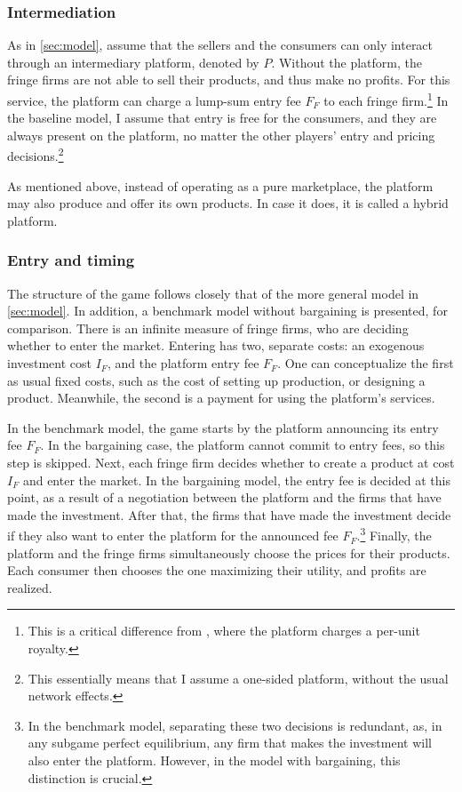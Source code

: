 \documentclass[a4paper]{article}
\begin{document}
\subsubsection{Intermediation}

As in \cref{sec:model}, assume that the sellers and the consumers can only interact through an intermediary platform, denoted by $P$.
Without the platform, the fringe firms are not able to sell their products, and thus make no profits.
For this service, the platform can charge a lump-sum entry fee $F_F$ to each fringe firm.\footnote{
    This is a critical difference from \textcite[]{anderson2021hybrid}, where the platform charges a per-unit royalty.
}
In the baseline model, I assume that entry is free for the consumers, and they are always present on the platform, no matter the other players' entry and pricing decisions.\footnote{
    This essentially means that I assume a one-sided platform, without the usual network effects.
}

As mentioned above, instead of operating as a pure marketplace, the platform may also produce and offer its own products.
In case it does, it is called a hybrid platform.

\subsubsection{Entry and timing}

The structure of the game follows closely that of the more general model in \cref{sec:model}.
In addition, a benchmark model without bargaining is presented, for comparison.
There is an infinite measure of fringe firms, who are deciding whether to enter the market.
Entering has two, separate costs: an exogenous investment cost $I_F$, and the platform entry fee $F_F$.
One can conceptualize the first as usual fixed costs, such as the cost of setting up production, or designing a product.
Meanwhile, the second is a payment for using the platform's services.

In the benchmark model, the game starts by the platform announcing its entry fee $F_F$.
In the bargaining case, the platform cannot commit to entry fees, so this step is skipped.
Next, each fringe firm decides whether to create a product at cost $I_F$ and enter the market.
In the bargaining model, the entry fee is decided at this point, as a result of a negotiation between the platform and the firms that have made the investment.
After that, the firms that have made the investment decide if they also want to enter the platform for the announced fee $F_F$.\footnote{
    In the benchmark model, separating these two decisions is redundant, as, in any subgame perfect equilibrium, any firm that makes the investment will also enter the platform.
    However, in the model with bargaining, this distinction is crucial.
}
Finally, the platform and the fringe firms simultaneously choose the prices for their products.
Each consumer then chooses the one maximizing their utility, and profits are realized.
\end{document}
